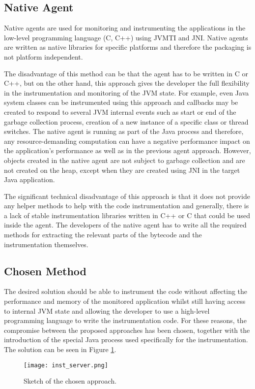 \subsection{Native Agent}
Native agents are used for monitoring and instrumenting the applications in the low-level programming language (C, C++) using JVMTI and JNI. Native agents are written as native libraries for specific platforms and therefore the packaging is not platform independent. 

The disadvantage of this method can be that the agent has to be written in C or C++, but on the other hand, this approach gives the developer the full flexibility in the instrumentation and monitoring of the JVM state. For example, even Java system classes can be instrumented using this approach and callbacks may be created to respond to several JVM internal events such as start or end of the garbage collection process, creation of a new instance of a specific class or thread switches. The native agent is running as part of the Java process and therefore, any resource-demanding computation can have a negative performance impact on the application's performance as well as in the previous agent approach. However, objects created in the native agent are not subject to garbage collection and are not created on the heap, except when they are created using JNI in the target Java application.

The significant technical disadvantage of this approach is that it does not provide any helper methods to help with the code instrumentation and generally, there is a lack of stable instrumentation libraries written in C++ or C that could be used inside the agent. The developers of the native agent has to write all the required methods for extracting the relevant parts of the bytecode and the instrumentation themselves.
\subsection{Chosen Method}
\label{subsec:inst_jvm}
The desired solution should be able to instrument the code without affecting the performance and memory of the monitored application whilst still having access to internal JVM state and allowing the developer to use a high-level programming language to write the instrumentation code. For these reasons, the compromise between the proposed approaches has been chosen, together with the introduction of the special Java process used specifically for the instrumentation. The solution can be seen in Figure \ref{fig:inst_server_basic}.
\begin{figure}
	\centering
	\texttt{[image: inst\_server.png]}
	\caption{Sketch of the chosen approach.}
	\label{fig:inst_server_basic}
\end{figure}

